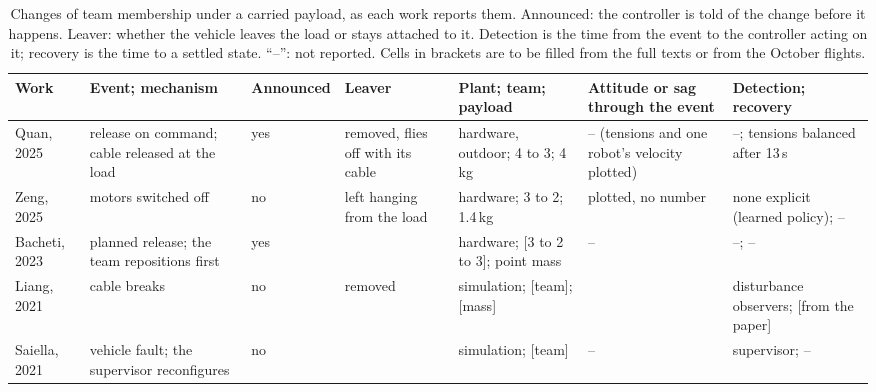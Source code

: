 \begin{table}[htbp]
\centering
\footnotesize
\setlength{\tabcolsep}{3pt}
\caption[Changes of team membership under a carried payload]{Changes of team membership under a carried
payload, as each work reports them. Announced: the controller is told of the change before it happens. Leaver:
whether the vehicle leaves the load or stays attached to it. Detection is the time from the event to the
controller acting on it; recovery is the time to a settled state. ``--'': not reported. Cells in brackets are to be
filled from the full texts or from the October flights.}
\label{tab:membership}
\begin{tabularx}{\textwidth}{@{}
  >{\raggedright\arraybackslash\hsize=0.86\hsize}X
  >{\raggedright\arraybackslash\hsize=1.04\hsize}X
  >{\raggedright\arraybackslash\hsize=0.78\hsize}X
  >{\raggedright\arraybackslash\hsize=0.90\hsize}X
  >{\raggedright\arraybackslash\hsize=1.04\hsize}X
  >{\raggedright\arraybackslash\hsize=1.14\hsize}X
  >{\raggedright\arraybackslash\hsize=1.24\hsize}X@{}}
\toprule
Work & Event; mechanism & Announced & Leaver & Plant; team; payload & Attitude or sag through the event &
Detection; recovery \\
\midrule
Quan\newline \cite{quan2025swarm}, 2025 & release on command; cable released at the load & yes & removed, flies off with
its cable & hardware, outdoor; 4 to 3; 4\,kg & -- (tensions and one robot's velocity plotted) & --; tensions
balanced after 13\,s \\
\addlinespace
Zeng\newline \cite{zeng2025marl}, 2025 & motors switched off & no & left hanging from the load & hardware; 3 to 2;
1.4\,kg & plotted, no number & none explicit (learned policy); -- \\
\addlinespace
Bacheti\newline \cite{tensionbased}, 2023 & planned release; the team repositions first & yes & [removed; count to
verify] & hardware; [3 to 2 to 3]; point mass & -- & --; -- \\
\addlinespace
Liang\newline \cite{liang2021fault}, 2021 & cable breaks & no & removed & simulation; [team]; [mass] & [from the paper] &
disturbance observers; [from the paper] \\
\addlinespace
Saiella\newline \cite{saiella2021fault}, 2021 & vehicle fault; the supervisor reconfigures & no & [from the paper] &
simulation; [team] & -- & supervisor; -- \\

\end{tabularx}
\end{table}
